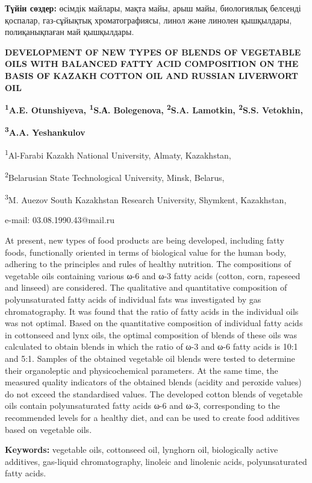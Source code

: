 {\bfseries Түйін сөздер:} өсімдік майлары, мақта майы, арыш майы,
биологиялық белсенді қоспалар, газ-сұйықтық хроматографиясы, линол және
линолен қышқылдары, полиқанықпаған май қышқылдары.

\begin{center}
{\large\bfseries DEVELOPMENT OF NEW TYPES OF BLENDS OF VEGETABLE OILS WITH
BALANCED FATTY ACID COMPOSITION ON THE BASIS OF KAZAKH COTTON OIL AND
RUSSIAN LIVERWORT OIL}

{\bfseries \textsuperscript{1}A.E. Otunshiyeva, \textsuperscript{1}S.А.
Bolegenova, \textsuperscript{2}S.A. Lamotkin, \textsuperscript{2}S.S.
Vetokhin,}

{\bfseries \textsuperscript{3}A.A. Yeshankulov}

\textsuperscript{1}Al-Farabi Kazakh National University, Almaty,
Kazakhstan,

\textsuperscript{2}Belarusian State Technological University, Minsk,
Belarus,

\textsuperscript{3}M. Auezov South Kazakhstan Research University,
Shymkent, Kazakhstan,

e-mail: 03.08.1990.43@mail.ru
\end{center}

At present, new types of food products are being developed, including
fatty foods, functionally oriented in terms of biological value for the
human body, adhering to the principles and rules of healthy nutrition.
The compositions of vegetable oils containing various ω-6 and ω-3 fatty
acids (cotton, corn, rapeseed and linseed) are considered. The
qualitative and quantitative composition of polyunsaturated fatty acids
of individual fats was investigated by gas chromatography. It was found
that the ratio of fatty acids in the individual oils was not optimal.
Based on the quantitative composition of individual fatty acids in
cottonseed and lynx oils, the optimal composition of blends of these
oils was calculated to obtain blends in which the ratio of ω-3 and ω-6
fatty acids is 10:1 and 5:1. Samples of the obtained vegetable oil
blends were tested to determine their organoleptic and physicochemical
parameters. At the same time, the measured quality indicators of the
obtained blends (acidity and peroxide values) do not exceed the
standardised values. The developed cotton blends of vegetable oils
contain polyunsaturated fatty acids ω-6 and ω-3, corresponding to the
recommended levels for a healthy diet, and can be used to create food
additives based on vegetable oils.

{\bfseries Keywords:} vegetable oils, cottonseed oil, lynghorn oil,
biologically active additives, gas-liquid chromatography, linoleic and
linolenic acids, polyunsaturated fatty acids.

